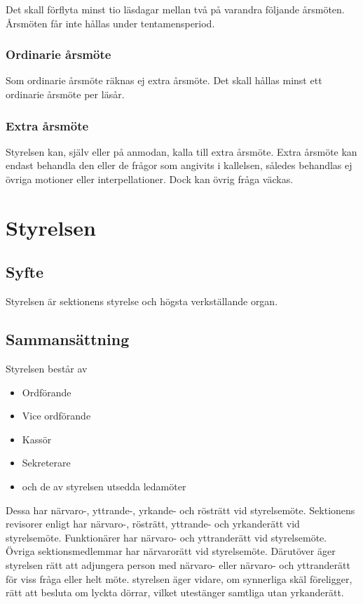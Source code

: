 \documentclass{dgovdoc}
\begin{document}
Det skall förflyta minst tio läsdagar mellan två på varandra följande årsmöten. Årsmöten
får inte hållas under tentamensperiod.

\subsubsection{Ordinarie årsmöte}
\label{sec:ordinarie_sm}

Som ordinarie årsmöte räknas ej extra årsmöte. Det
skall hållas minst ett ordinarie årsmöte per läsår.

\subsubsection{Extra årsmöte}

Styrelsen kan, själv eller på anmodan, kalla till extra årsmöte. Extra årsmöte kan
endast behandla den eller de frågor som angivits i kallelsen, således behandlas
ej övriga motioner eller interpellationer. Dock kan övrig fråga
väckas.

\section{Styrelsen}

\subsection{Syfte}

Styrelsen är sektionens styrelse och högsta verkställande organ.

\subsection{Sammansättning}

Styrelsen består av

\begin{itemize}
  \item Ordförande
  \item Vice ordförande
  \item Kassör
  \item Sekreterare
  \item och de av styrelsen utsedda ledamöter
\end{itemize}

Dessa har närvaro-, yttrande-, yrkande- och rösträtt vid styrelsemöte. Sektionens
revisorer enligt har närvaro-, rösträtt, yttrande- och yrkanderätt vid styrelsemöte. 
Funktionärer har närvaro- och yttranderätt vid styrelsemöte. Övriga sektionsmedlemmar har närvarorätt
vid styrelsemöte. Därutöver äger styrelsen rätt att adjungera person med närvaro-
eller närvaro- och yttranderätt för viss fråga eller helt möte. styrelsen
äger vidare, om synnerliga skäl föreligger, rätt att besluta om lyckta dörrar,
vilket utestänger samtliga utan yrkanderätt.
\end{document}
